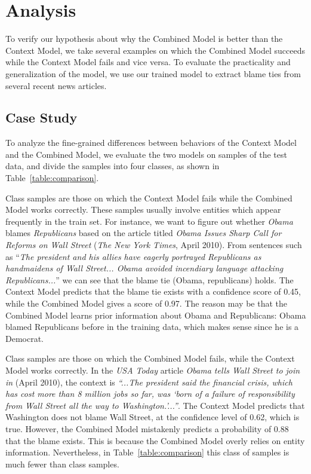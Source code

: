 \documentclass[letterpaper]{article} %
\begin{document}
\section{Analysis}

To verify our hypothesis about why the Combined Model is better than the Context Model, we take several examples on which the Combined Model succeeds while the Context Model fails and vice versa. To evaluate the practicality and generalization of the model, we use our trained model to extract blame ties from several recent news articles.

\subsection{Case Study}

To analyze the fine-grained differences between behaviors of the Context Model and the Combined Model, we evaluate the two models on samples of the test data, and divide the samples into four classes, as shown in Table~\ref{table:comparison}.

Class  samples are those on which the Context Model fails while the Combined Model works correctly. These samples usually involve entities which appear frequently in the train set. For instance, we want to figure out whether {\it Obama} blames {\it Republicans} based on the article titled {\it Obama Issues Sharp Call for Reforms on Wall Street} ({\it The New York Times}, April 2010). From sentences such as ``{\it The president and his allies have eagerly portrayed Republicans as handmaidens of Wall Street... Obama avoided incendiary language attacking Republicans...}'' we can see that the blame tie (Obama, republicans) holds. The Context Model predicts that the blame tie exists with a confidence score of 0.45, while the Combined Model gives a score of 0.97. The reason may be that the Combined Model learns prior information about Obama and Republicans: Obama blamed Republicans before in the training data, which makes sense since he is a Democrat.

Class  samples are those on which the Combined Model fails, while the Context Model works correctly. In the {\it USA Today} article {\it Obama tells Wall Street to join in} (April 2010), the context is {\it ``...The president said the financial crisis, which has cost more than 8 million jobs so far, was `born of a failure of responsibility from Wall Street all the way to Washington.'...''}. The Context Model predicts that Washington does not blame Wall Street, at the confidence level of 0.62, which is true. However, the Combined Model mistakenly predicts a probability of 0.88 that the blame exists. This is because the Combined Model overly relies on entity information. Nevertheless, in Table~\ref{table:comparison} this class of samples is much fewer than class  samples.
\end{document}
